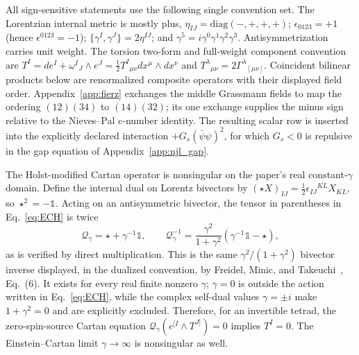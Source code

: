 \documentclass[aps,prd,twocolumn,superscriptaddress,showpacs,preprintnumbers,nofootinbib,longbibliography,floatfix]{revtex4-2}
\begin{document}
All sign-sensitive statements use the following single convention set.
The Lorentzian internal metric is mostly plus,
$\eta_{IJ}=\mathrm{diag}(-,+,+,+)$; $\epsilon_{0123}=+1$ (hence
$\epsilon^{0123}=-1$); $\{\gamma^I,\gamma^J\}=2\eta^{IJ}$; and
$\gamma^5=i\gamma^0\gamma^1\gamma^2\gamma^3$.  Antisymmetrization carries
unit weight.  The torsion two-form and full-weight component convention are
$T^I=de^I+\omega^I{}_J\wedge e^J
=\tfrac12T^I{}_{\mu\nu}dx^\mu\wedge dx^\nu$ and
$T^\lambda{}_{\mu\nu}=2\Gamma^\lambda{}_{[\mu\nu]}$.  Coincident bilinear
products below are renormalized composite operators with their displayed
field order.  Appendix~\ref{app:fierz} exchanges the middle Grassmann fields
to map the ordering $(12)(34)$ to $(14)(32)$; its one exchange supplies the
minus sign relative to the Nieves--Pal c-number identity.  The resulting
scalar row is inserted into the explicitly declared interaction
$+G_s(\bar\psi\psi)^2$, for which $G_s<0$ is repulsive in the gap equation of
Appendix~\ref{app:njl_gap}.

The Holst-modified Cartan operator is nonsingular on the paper's real
constant-$\gamma$ domain.  Define the internal dual on Lorentz bivectors by
$(\star X)_{IJ}=\tfrac12\epsilon_{IJ}{}^{KL}X_{KL}$, so
$\star^2=-\mathbb 1$.  Acting on an antisymmetric bivector, the tensor in
parentheses in Eq.~\eqref{eq:ECH} is twice
\begin{equation}\label{eq:holst_cartan_inverse}
\mathcal Q_\gamma=\star+\gamma^{-1}\mathbb 1,\qquad
\mathcal Q_\gamma^{-1}
=\frac{\gamma^2}{1+\gamma^2}
\left(\gamma^{-1}\mathbb 1-\star\right),
\end{equation}
as is verified by direct multiplication.  This is the same
$\gamma^2/(1+\gamma^2)$ bivector inverse displayed, in the dualized
convention, by Freidel, Minic, and Takeuchi~\cite{Freidel2005}, Eq.~(6).
It exists for every real finite nonzero $\gamma$; $\gamma=0$ is outside the
action written in Eq.~\eqref{eq:ECH}, while the complex self-dual values
$\gamma=\pm i$ make $1+\gamma^2=0$ and are explicitly excluded.  Therefore,
for an invertible tetrad, the zero-spin-source Cartan equation
$\mathcal Q_\gamma(e^{[I}\wedge T^{J]})=0$ implies $T^I=0$.  The
Einstein--Cartan limit $\gamma\to\infty$ is nonsingular as well.
\end{document}

